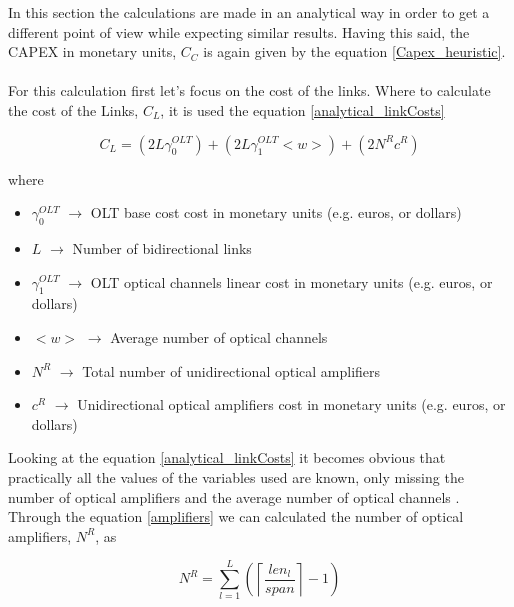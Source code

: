 \vspace{11pt}
In this section the calculations are made in an analytical way in order to get a different point of view while expecting similar results. Having this said, the CAPEX in monetary units, $C_C$ is again given by the equation \ref{Capex_heuristic}.\\ \\

For this calculation first let's focus on the cost of the links. Where to calculate the cost of the Links, $C_L$, it is used the equation \ref{analytical_linkCosts}
\vspace{11pt}

\begin{equation}
C_L = \left(2 L \gamma_0^{OLT}\right) + \left(2 L \gamma_1^{OLT} <w>\right) + \left(2 N^R c^R\right)
\label{analytical_linkCosts}
\end{equation}

\vspace{11pt}
\noindent
\clearpage
where
\begin{itemize}
\item{$\gamma_0^{OLT}$	$\rightarrow$	OLT base cost cost in monetary units (e.g. euros, or dollars)}
\item{$L$				$\rightarrow$	Number of bidirectional links}
\item{$\gamma_1^{OLT}$	$\rightarrow$	OLT optical channels linear cost in monetary units (e.g. euros, or dollars)}
\item{$<w>$             $\rightarrow$   Average number of optical channels}
\item{$N^R$				$\rightarrow$	Total number of unidirectional optical amplifiers}
\item{$c^R$				$\rightarrow$	Unidirectional optical amplifiers cost in monetary units (e.g. euros, or dollars)}
\end{itemize}

\vspace{11pt}
Looking at the equation \ref{analytical_linkCosts} it becomes obvious that practically all the values of the variables used are known, only missing the number of optical amplifiers and the average number of optical channels \cite{anpinto2}.\\

Through the equation \ref{amplifiers} we can calculated the number of optical amplifiers, $N^R$, as

\begin{equation}
N^R = \sum\limits_{l=1}^L\left(\left\lceil\frac{len_l}{span}\right\rceil-1\right)
\label{amplifiers}
\end{equation}

